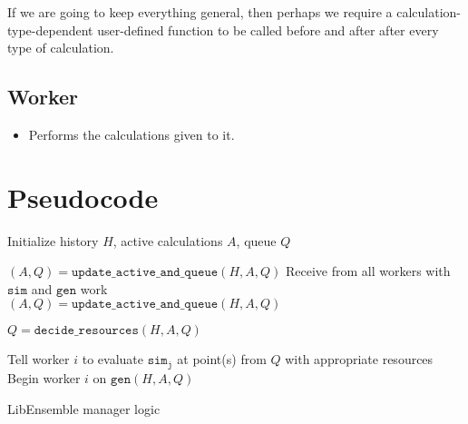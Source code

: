 \documentclass{article}
\begin{document}
If we are going to keep everything general, then perhaps we require a
calculation-type-dependent user-defined function to be called before and after
after every type of calculation.

\subsection{Worker}
\begin{itemize}
  \item Performs the calculations given to it.
\end{itemize}


\section{Pseudocode}

\newpage
\LinesNumbered
\begin{algorithm}[t] %
  Initialize history $H$, active calculations $A$, queue $Q$

  
  {
    $(A,Q) = \mathtt{update\_active\_and\_queue}(H,A,Q)$ 
    {
      Receive from all workers with $\mathtt{sim}$ and $\mathtt{gen}$ work\\
      $(A,Q) = \mathtt{update\_active\_and\_queue}(H,A,Q)$ 
    }

    $Q = \mathtt{decide\_resources}(H,A,Q)$

    {
      {
      Tell worker $i$ to evaluate $\mathtt{sim_j}$ at point(s) from $Q$ with appropriate resources
      }{
      Begin worker $i$ on $\mathtt{gen}(H,A,Q)$\\
      }

    }
  }
  \caption{LibEnsemble manager logic \label{alg:manager}} 
\end{algorithm}
\end{document}
